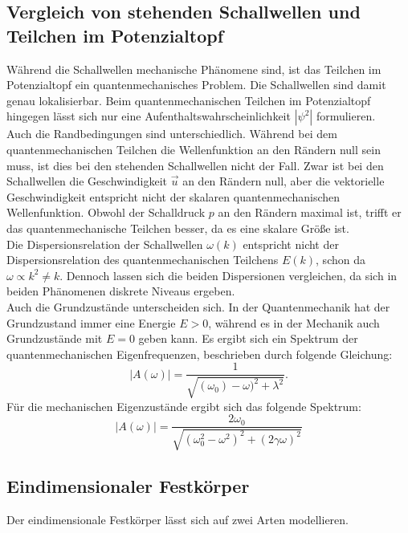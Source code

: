 \subsection{Vergleich von stehenden Schallwellen und Teilchen im Potenzialtopf}
Während die Schallwellen mechanische Phänomene sind, ist das Teilchen im Potenzialtopf ein quantenmechanisches Problem.
Die Schallwellen sind damit genau lokalisierbar.
Beim quantenmechanischen Teilchen im Potenzialtopf hingegen lässt sich nur eine Aufenthaltswahrscheinlichkeit $|\psi^2|$ formulieren.\\
Auch die Randbedingungen sind unterschiedlich.
Während bei dem quantenmechanischen Teilchen die Wellenfunktion an den Rändern null sein muss, ist dies bei den stehenden Schallwellen nicht der Fall.
Zwar ist bei den Schallwellen die Geschwindigkeit $\vec{u}$ an den Rändern null, aber die vektorielle Geschwindigkeit entspricht nicht der skalaren quantenmechanischen Wellenfunktion.
Obwohl der Schalldruck $p$ an den Rändern maximal ist, trifft er das quantenmechanische Teilchen besser, da es eine skalare Größe ist.\\
Die Dispersionsrelation der Schallwellen $\omega(k)$ entspricht nicht der Dispersionsrelation des quantenmechanischen Teilchens $E(k)$, schon da $\omega \propto k^2 ≠ k$.
Dennoch lassen sich die beiden Dispersionen vergleichen, da sich in beiden Phänomenen diskrete Niveaus ergeben.\\
Auch die Grundzustände unterscheiden sich.
In der Quantenmechanik hat der Grundzustand immer eine Energie $E>0$, während es in der Mechanik auch Grundzustände mit $E=0$ geben kann.
Es ergibt sich ein Spektrum der quantenmechanischen Eigenfrequenzen, beschrieben durch folgende Gleichung:
\begin{equation}
  |A(\omega)| = \frac{ 1 }{ \sqrt{ (\omega_{0}) - \omega)^2 + \lambda^2} }.
  \label{eqn:spektrumqm}
\end{equation}
Für die mechanischen Eigenzustände ergibt sich das folgende Spektrum:
\begin{equation}
  |A(\omega)| = \frac{ 2 \omega_{0} }{ \sqrt{ (\omega_{0}^2 - \omega^2)^2 + (2 \gamma \omega)^2 } }
  \label{eqn:spektrumschall}
\end{equation}
%
\subsection{Eindimensionaler Festkörper}
Der eindimensionale Festkörper lässt sich auf zwei Arten modellieren.
